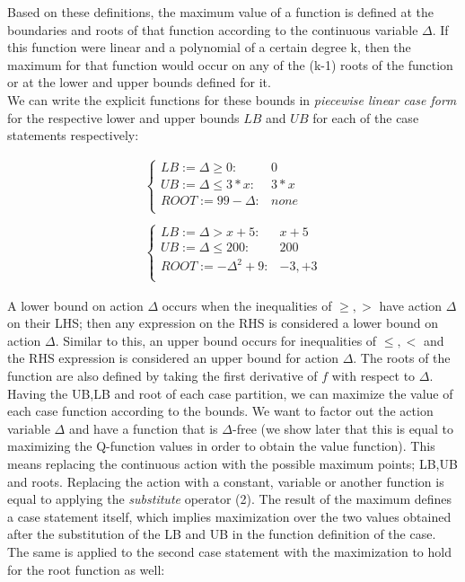 \documentclass[letterpaper]{article}
\renewcommand{\-}{\text{-}}
\begin{document}
Based on these definitions, the maximum value of a function is defined at the boundaries and roots of that function according to the continuous variable $\Delta$. If this function were linear and a polynomial of a certain degree k, then the maximum for that function would occur on any of the (k-1) roots of the function or at the lower and upper bounds defined for it. 
\\We can write the explicit functions for these bounds in  \emph{piecewise linear case form} for the respective lower and upper bounds $LB$ and $UB$ for each of the case statements respectively:

{\footnotesize
\begin{align*}
\begin{cases}
 LB := \Delta \geq 0 : & 0 \\ 
 UB := \Delta \leq 3*x : & 3*x \\ 
 ROOT := 99- \Delta : & none \\ 
  \end{cases}
  \\ \\
  \begin{cases}
  LB:= \Delta > x+ 5: & x+5 \\ 
  UB:=\Delta \leq 200 : & 200 \\ 
  ROOT := - \Delta^{2} +9 : &  {-3,+3} \\ 
\end{cases} 
\end{align*}
}

A lower bound on action $\Delta$ occurs when the inequalities of $\geq ,>$ have action $\Delta$ on their LHS; then any expression on the RHS is considered a lower bound on action $\Delta$. Similar to this, an upper bound occurs for inequalities of $\leq , <$ and the RHS expression is considered an upper bound for action $\Delta$. 
The roots of the function are also defined by taking the first derivative of $f$ with respect to $\Delta$.
\\Having the UB,LB and root of each case partition, we can maximize the value of each case function according to the bounds. We want to factor out the action variable $\Delta$ and have a function that is $\Delta$-free (we show later that this is equal to maximizing the Q-function values in order to obtain the value function). This means replacing the continuous action with the possible maximum points; LB,UB and roots. Replacing the action with a constant, variable or another function is equal to applying the \emph{substitute} operator (2). The result of the maximum defines a case statement itself, which implies maximization over the two values obtained after the substitution of the LB and UB in the function definition of the case. The same is applied to the second case statement with the maximization to hold for the root function as well: 
\end{document}
